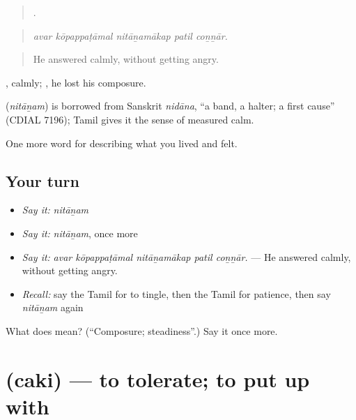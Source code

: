\begin{quote}
    .
\end{quote}

\begin{quote}
\emph{avar kōpappaṭāmal nitāṉamākap patil coṉṉār.}
\end{quote}

\begin{quote}
He answered calmly, without getting angry.
\end{quote}

, calmly;  , he lost his composure.

\begin{cousinweb}
\textbf{} (\emph{nitāṉam}) is borrowed from Sanskrit \emph{nidāna}, \textquotedblleft{}a band, a halter; a first cause\textquotedblright{} (CDIAL 7196); Tamil gives it the sense of measured calm.
\end{cousinweb}

\begin{grammarlens}[title={What you've built}]
One more word for describing what you lived and felt.
\end{grammarlens}

\subsection*{Your turn}
\begin{itemize}
\raggedright
  \item \emph{Say it:} \emph{nitāṉam}
  \item \emph{Say it:} \emph{nitāṉam}, once more
  \item \emph{Say it:} \emph{avar kōpappaṭāmal nitāṉamākap patil coṉṉār.} — He answered calmly, without getting angry.
  \item \emph{Recall:} say the Tamil for to tingle, then the Tamil for patience, then say \emph{nitāṉam} again
\end{itemize}

\begin{tcolorbox}[breakable,colback=teal!4,colframe=teal!35!black,title={Before you move on}]
What does  mean? (\textquotedblleft{}Composure; steadiness\textquotedblright{}.) Say it once more.
\end{tcolorbox}
\section[\texorpdfstring{\ta{சகி} (caki)}{சகி (caki)}]{ (caki) — to tolerate; to put up with}

